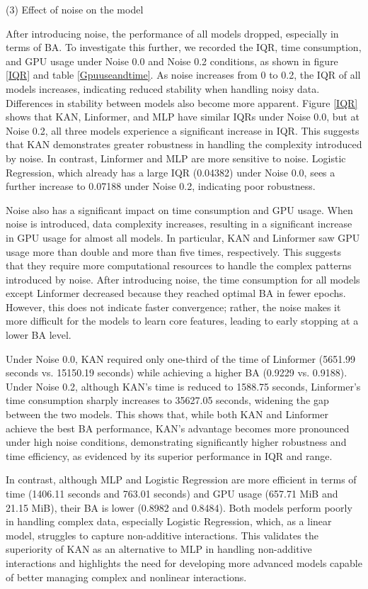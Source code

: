 \documentclass{article}
\begin{document}
(3) Effect of noise on the model

After introducing noise, the performance of all models dropped, especially in terms of BA. To investigate this further, we recorded the IQR, time consumption, and GPU usage under Noise 0.0 and Noise 0.2 conditions, as shown in figure \ref{IQR} and table \ref{Gpuuseandtime}. As noise increases from 0 to 0.2, the IQR of all models increases, indicating reduced stability when handling noisy data. Differences in stability between models also become more apparent. Figure \ref{IQR} shows that KAN, Linformer, and MLP have similar IQRs under Noise 0.0, but at Noise 0.2, all three models experience a significant increase in IQR. This suggests that KAN demonstrates greater robustness in handling the complexity introduced by noise. In contrast, Linformer and MLP are more sensitive to noise. Logistic Regression, which already has a large IQR (0.04382) under Noise 0.0, sees a further increase to 0.07188 under Noise 0.2, indicating poor robustness.

Noise also has a significant impact on time consumption and GPU usage. When noise is introduced, data complexity increases, resulting in a significant increase in GPU usage for almost all models. In particular, KAN and Linformer saw GPU usage more than double and more than five times, respectively. This suggests that they require more computational resources to handle the complex patterns introduced by noise. After introducing noise, the time consumption for all models except Linformer decreased because they reached optimal BA in fewer epochs. However, this does not indicate faster convergence; rather, the noise makes it more difficult for the models to learn core features, leading to early stopping at a lower BA level.

Under Noise 0.0, KAN required only one-third of the time of Linformer (5651.99 seconds vs. 15150.19 seconds) while achieving a higher BA (0.9229 vs. 0.9188). Under Noise 0.2, although KAN's time is reduced to 1588.75 seconds, Linformer's time consumption sharply increases to 35627.05 seconds, widening the gap between the two models. This shows that, while both KAN and Linformer achieve the best BA performance, KAN's advantage becomes more pronounced under high noise conditions, demonstrating significantly higher robustness and time efficiency, as evidenced by its superior performance in IQR and range. 

In contrast, although MLP and Logistic Regression are more efficient in terms of time (1406.11 seconds and 763.01 seconds) and GPU usage (657.71 MiB and 21.15 MiB), their BA is lower (0.8982 and 0.8484). Both models perform poorly in handling complex data, especially Logistic Regression, which, as a linear model, struggles to capture non-additive interactions. This validates the superiority of KAN as an alternative to MLP in handling non-additive interactions and highlights the need for developing more advanced models capable of better managing complex and nonlinear interactions. 
\end{document}
